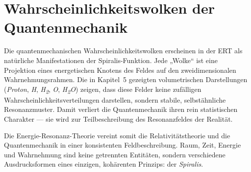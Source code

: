 \section{Wahrscheinlichkeitswolken der Quantenmechanik}
Die quantenmechanischen Wahrscheinlichkeitswolken erscheinen in der ERT als natürliche Manifestationen der Spiralis-Funktion.  
Jede „Wolke“ ist eine Projektion eines energetischen Knotens des Feldes auf den zweidimensionalen Wahrnehmungsrahmen.  
Die in Kapitel~5 gezeigten volumetrischen Darstellungen (\textit{Proton}, \textit{H}, \textit{H\textsubscript{2}}, \textit{O}, \textit{H\textsubscript{2}O}) zeigen, dass diese Felder keine zufälligen Wahrscheinlichkeitsverteilungen darstellen, sondern stabile, selbstähnliche Resonanzmuster.  
Damit verliert die Quantenmechanik ihren rein statistischen Charakter — sie wird zur Teilbeschreibung des Resonanzfeldes der Realität.  

\vspace{1em}
\noindent
Die Energie-Resonanz-Theorie vereint somit die Relativitätstheorie und die Quantenmechanik in einer konsistenten Feldbeschreibung. 
Raum, Zeit, Energie und Wahrnehmung sind keine getrennten Entitäten, sondern verschiedene Ausdrucksformen eines einzigen, kohärenten Prinzips: der \textit{Spiralis}.
